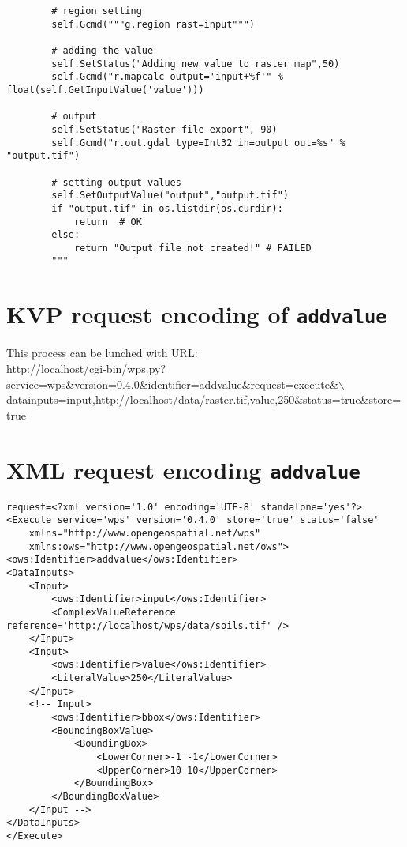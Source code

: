 \documentclass[a4paper,11pt]{article}
\begin{document}
\begin{verbatim}
        # region setting
        self.Gcmd("""g.region rast=input""")    

        # adding the value
        self.SetStatus("Adding new value to raster map",50)
        self.Gcmd("r.mapcalc output='input+%f'" % float(self.GetInputValue('value')))

        # output
        self.SetStatus("Raster file export", 90)
        self.Gcmd("r.out.gdal type=Int32 in=output out=%s" % "output.tif")

        # setting output values
        self.SetOutputValue("output","output.tif")
        if "output.tif" in os.listdir(os.curdir):
            return  # OK
        else:
            return "Output file not created!" # FAILED
        """
    \end{verbatim}

\section{KVP request encoding of \texttt{addvalue}}
    This process can be lunched with URL:\\
    http://localhost/cgi-bin/wps.py?service=wps\&version=0.4.0\&identifier=addvalue\&request=execute\&$\backslash$\\
    datainputs=input,http://localhost/data/raster.tif,value,250\&status=true\&store=true

    \section{XML request encoding \texttt{addvalue}}
\begin{verbatim}
request=<?xml version='1.0' encoding='UTF-8' standalone='yes'?>
<Execute service='wps' version='0.4.0' store='true' status='false'
    xmlns="http://www.opengeospatial.net/wps"
    xmlns:ows="http://www.opengeospatial.net/ows">
<ows:Identifier>addvalue</ows:Identifier>
<DataInputs>
    <Input>
        <ows:Identifier>input</ows:Identifier>
        <ComplexValueReference reference='http://localhost/wps/data/soils.tif' />
    </Input>
    <Input>
        <ows:Identifier>value</ows:Identifier>
        <LiteralValue>250</LiteralValue>
    </Input>
    <!-- Input>
        <ows:Identifier>bbox</ows:Identifier>
        <BoundingBoxValue>
            <BoundingBox>
                <LowerCorner>-1 -1</LowerCorner>
                <UpperCorner>10 10</UpperCorner>
            </BoundingBox>
        </BoundingBoxValue>
    </Input -->
</DataInputs>
</Execute>
\end{verbatim}
\end{document}

